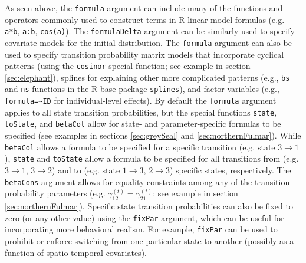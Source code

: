 \documentclass[12pt]{article}\usepackage[]{graphicx}\usepackage[]{color}
\begin{document}
As seen above, the \verb|formula| argument can include many of the functions and operators commonly used to construct terms in R linear model formulas (e.g. \verb|a*b|, \verb|a:b|, \verb|cos(a)|). The \verb|formulaDelta| argument can be similarly used to specify covariate models for the initial distribution.  The \verb|formula| argument can also be used to specify transition probability matrix models that incorporate cyclical patterns (using the \verb|cosinor| special function; see example in section \ref{sec:elephant}), splines for explaining other more complicated patterns (e.g., \verb|bs| and \verb|ns| functions in the R base package \verb|splines|), and factor variables (e.g., \verb|formula=~ID| for individual-level effects).  By default the \verb|formula| argument applies to all state transition probabilities, but the special functions \verb|state|, \verb|toState|, and \verb|betaCol| allow for state- and parameter-specific formulas to be specified (see examples in sections \ref{sec:greySeal} and \ref{sec:northernFulmar}). While \verb|betaCol| allows a formula to be specified for a specific transition (e.g. state $3 \rightarrow 1$), \verb|state| and \verb|toState| allow a formula to be specified for all transitions from (e.g. $3 \rightarrow 1$, $3 \rightarrow 2$) and to (e.g. state $1 \rightarrow 3$, $2 \rightarrow 3$) specific states, respectively. The \verb|betaCons| argument allows for equality constraints among any of the transition probability parameters (e.g. $\gamma^{(t)}_{12}=\gamma^{(t)}_{21}$; see example in section \ref{sec:northernFulmar}). Specific state transition probabilities can also be fixed to zero (or any other value) using the \verb|fixPar| argument, which can be useful for incorporating more behavioral realism.  For example, \verb|fixPar| can be used to prohibit or enforce switching from one particular state to another (possibly as a function of spatio-temporal covariates). 
\end{document}
